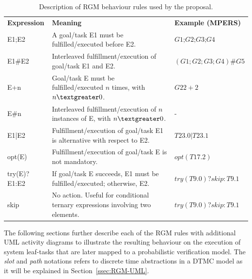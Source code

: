 \begin{table}[h]
{\renewcommand{\arraystretch}{1.5}
\begin{tabularx}{\textwidth}{@{}l|X|X@{}}
\toprule
\textbf{Expression} & \textbf{Meaning}                                                                   & \textbf{Example (MPERS)} \\ 
E1;E2               & A goal/task E1 must be fulfilled/executed before E2.                               & $G1\textbf{;}G2\textbf{;}G3\textbf{;}G4$                 \\ 
E1\#E2              & Interleaved fulfillment/execution of goal/task E1 and E2.                          & $(G1;G2;G3;G4)\textbf{\#}G5$                   \\ 
E+n                 & Goal/task E must be fulfilled/executed $n$ times, with $n \textgreater 0$.             & $G22+2$                    \\
E\#n                & Interleaved fulfillment/execution of $n$ instances of E, with $n \textgreater 0$.      & -                        \\
E1|E2               & Fulfillment/execution of goal/task E1 is alternative with respect to E2. & $T23.0|T23.1$                \\ 
opt(E)              & Fulfillment/execution of goal/task E is not mandatory.                             & $opt(T17.2)$               \\  
try(E)?E1:E2        & If goal/task E succeeds, E1 must be fulfilled/executed; otherwise, E2.             & $try(T9.0)?skip:T9.1$        \\ 
skip                & No action. Useful for conditional ternary expressions involving two elements.      & $try(T9.0)?skip:T9.1$        \\  \bottomrule
\end{tabularx}
}
\caption{Description of RGM behaviour rules used by the proposal.}
\label{tab:RGM_REGEX}
\end{table}

The following sections further describe each of the RGM rules with additional UML activity diagrams to illustrate the resulting behaviour on the execution of system leaf-tasks that are later mapped to a probabilistic verification model. The \textit{slot} and \textit{path} notations refers to discrete time abstractions in a DTMC model as it will be explained in Section~\ref{ssec:RGM-UML}.

